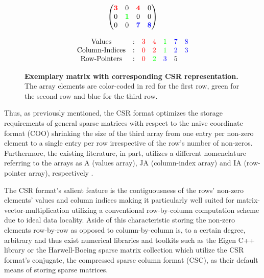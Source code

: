 \documentclass{article}
\begin{document}
    \begin{figure}[ht]
      \centering
      \begin{minipage}{0.4\textwidth}
        \centering
        $$
        \begin{pmatrix}
          \color{red}{\bm{3}} &                     0 &  \color{red}{\bm{4}} &                    0 \\
                            0 & \color{green}{\bm{1}} &                    0 &                    0 \\
                            0 &                     0 & \color{blue}{\bm{7}} & \color{blue}{\bm{8}} \\
        \end{pmatrix}
        $$
      \end{minipage}
      \begin{minipage}{0.4\textwidth}
        \centering
        $$
        \begin{matrix}
          \text{Values}  & : & \color{red}{3} &   \color{red}{4} & \color{green}{1} & \color{blue}{7} & \color{blue}{8} \\
          \text{Column-Indices} & : & \color{red}{0} &   \color{red}{2} & \color{green}{1} & \color{blue}{2} & \color{blue}{3} \\
          \text{Row-Pointers} & : & \color{red}{0} & \color{green}{2} &  \color{blue}{3} &               5 &                 \\
        \end{matrix}
        $$
      \end{minipage}
      \caption[Exemplary matrix with corresponding CSR representation.]{\textbf{Exemplary matrix with corresponding CSR representation.} The array elements are color-coded in red for the first row, green for the second row and blue for the third row.}
      \label{fig:csr_example}
    \end{figure}

    Thus, as previously mentioned, the CSR format optimizes the storage requirements of general sparse matrices with respect to the naive coordinate format (COO) shrinking the size of the third array from one entry per non-zero element to a single entry per row irrespective of the row's number of non-zeros. Furthermore, the existing literature, in part, utilizes a different nomenclature referring to the arrays as A (values array), JA (column-index array) and IA (row-pointer array), respectively \cite{sparskit}.

    The CSR format's salient feature is the contiguousness of the rows' non-zero elements' values and column indices making it particularly well suited for matrix-vector-multiplication utilizing a conventional row-by-column computation scheme due to ideal data locality. Aside of this characteristic storing the non-zero elements row-by-row as opposed to column-by-column is, to a certain degree, arbitrary and thus exist numerical libraries and toolkits such as the Eigen C++ library \cite{eigen:website} or the Harwell-Boeing sparse matrix collection \cite{harwell-boeing} which utilize the CSR format's conjugate, the compressed sparse column format (CSC), as their default means of storing sparse matrices.
\end{document}
